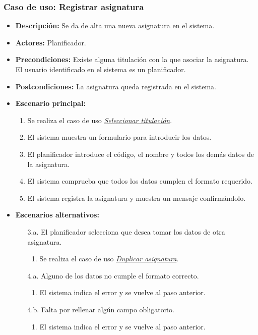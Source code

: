 \subsubsection*{Caso de uso: Registrar asignatura}
\begin{itemize}
\item{\bf Descripción:} Se da de alta una nueva asignatura en el sistema.
\item{\bf Actores:} Planificador.
\item{\bf Precondiciones:} Existe alguna titulación con la que asociar la asignatura. El usuario identificado en el sistema es un planificador.
\item{\bf Postcondiciones:} La asignatura queda registrada en el sistema.
\item{\bf Escenario principal:}
	\begin{enumerate}
 	\item Se realiza el caso de uso {\em\hyperref[select_titulacion]{Seleccionar titulación}}.
	\item El sistema muestra un formulario para introducir los datos.
	\item El planificador introduce el código, el nombre y todos los demás datos de la asignatura.
	\item El sistema comprueba que todos los datos cumplen el formato requerido.
	\item El sistema registra la asignatura y muestra un mensaje confirmándolo.
	\end{enumerate}
\item{\bf Escenarios alternativos:}
	\begin{itemize}
	\item[3.a.] El planificador selecciona que desea tomar los datos de otra asignatura.
		\begin{enumerate}
		\item Se realiza el caso de uso {\em \hyperref[duplicar_asignatura]{Duplicar asignatura}}.
		\end{enumerate}
	\item[4.a.] Alguno de los datos no cumple el formato correcto.
		\begin{enumerate}
		\item El sistema indica el error y se vuelve al paso anterior.
		\end{enumerate}
	\item[4.b.] Falta por rellenar algún campo obligatorio.
		\begin{enumerate}
		\item El sistema indica el error y se vuelve al paso anterior.

\end{enumerate}
\end{itemize}
\end{itemize}
